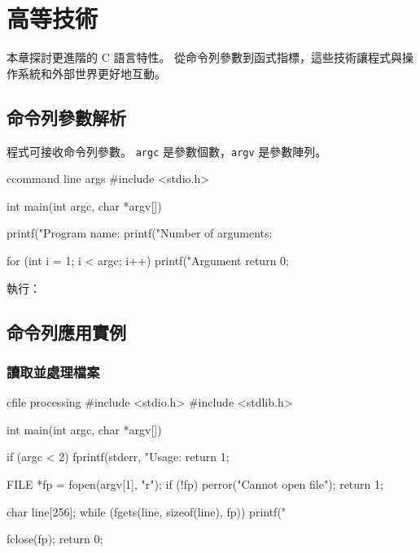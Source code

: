 \chapter{高等技術}

本章探討更進階的 C 語言特性。 從命令列參數到函式指標，這些技術讓程式與操作系統和外部世界更好地互動。

\section{命令列參數解析}

程式可接收命令列參數。 \texttt{argc} 是參數個數，\texttt{argv} 是參數陣列。

\begin{code}{c}{command line args}
#include <stdio.h>

int main(int argc, char *argv[]) {
    printf("Program name: %
    printf("Number of arguments: %

    for (int i = 1; i < argc; i++) {
        printf("Argument %
    }
    return 0;
}
\end{code}

執行：



\section{命令列應用實例}

\subsection*{讀取並處理檔案}

\begin{code}{c}{file processing}
#include <stdio.h>
#include <stdlib.h>

int main(int argc, char *argv[]) {
    if (argc < 2) {
        fprintf(stderr, "Usage: %
        return 1;
    }

    FILE *fp = fopen(argv[1], "r");
    if (!fp) {
        perror("Cannot open file");
        return 1;
    }

    char line[256];
    while (fgets(line, sizeof(line), fp)) {
        printf("%
    }

    fclose(fp);
    return 0;
}
\end{code}

